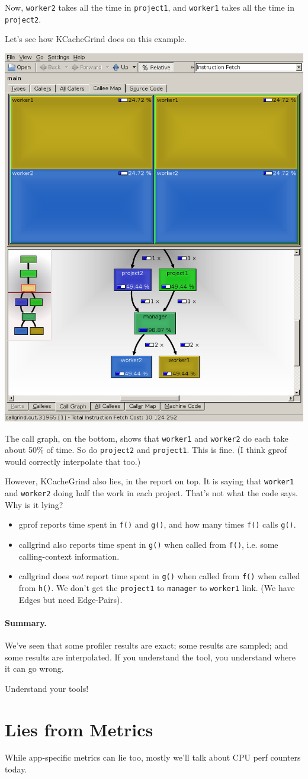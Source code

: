 \documentclass[a4paper]{report}
\begin{document}
Now, {\tt worker2} takes all the time in {\tt project1},
and {\tt worker1} takes all the time in {\tt project2}.

Let's see how KCacheGrind does on this example.

\begin{center}
  \includegraphics[width=.25\textwidth]{images/kcachegrind2}
\end{center}


The call graph, on the bottom, shows that 
{\tt worker1} and {\tt worker2} do each take about 50\% of time.
So do {\tt project2} and {\tt project1}. This is fine.
(I think gprof would correctly interpolate that too.)

However, KCacheGrind also lies, in the report on top. It is saying
that {\tt worker1} and {\tt worker2} doing half the work in each
project.  That's not what the code says. Why is it lying?

\begin{itemize}
\item gprof reports time spent in {\tt f()} and {\tt g()},
and how many times {\tt f()} calls {\tt g()}.
\item callgrind also reports 
time spent  in {\tt g()} when called from {\tt f()}, i.e. some calling-context information.
\item callgrind does \emph{not} report time spent in {\tt g()} when
     called from {\tt f()} when called from {\tt h()}.
     We don't get the {\tt project1} to {\tt manager} to {\tt worker1} link.
     (We have Edges but need Edge-Pairs).
\end{itemize}

\paragraph{Summary.} We've seen that some profiler results are exact;
some results are sampled; and some results are interpolated. If you understand the tool, you understand where it can go
wrong. 

Understand your tools!

\section*{Lies from Metrics}
While app-specific metrics can lie too, mostly we'll talk about CPU
perf counters today.
\end{document}

